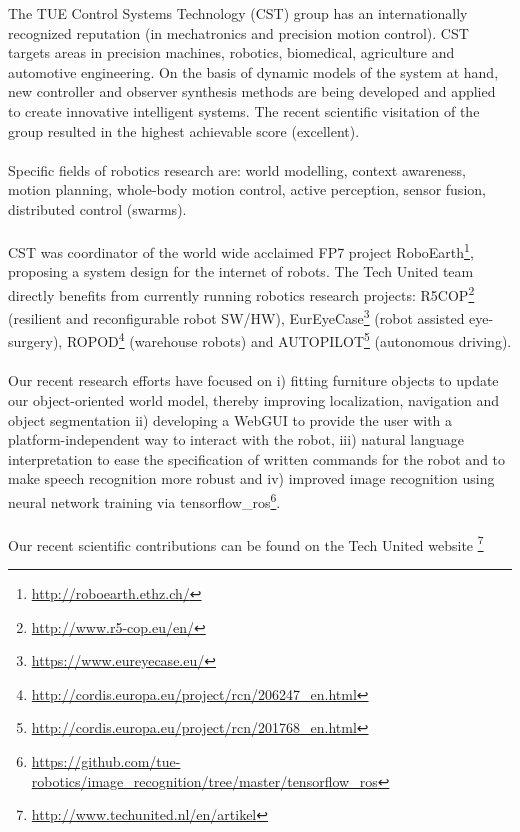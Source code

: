 The TUE Control Systems Technology (CST) group has an internationally recognized reputation (in mechatronics and precision motion control). CST targets areas in precision machines, robotics, biomedical, agriculture and automotive engineering. On the basis of dynamic models of the system at hand, new controller and observer synthesis methods are being developed and applied to create innovative intelligent systems. The recent scientific visitation of the group resulted in the highest achievable score (excellent). 
\\\\
Specific fields of robotics research are: world modelling, context awareness, motion planning, whole-body motion control, active perception, sensor fusion, distributed control (swarms).
\\\\
CST was coordinator of the world wide acclaimed FP7 project RoboEarth\footnote{\url{http://roboearth.ethz.ch/}}, proposing a system design for the internet of robots. The Tech United team directly benefits from currently running robotics research projects: R5COP\footnote{\url{http://www.r5-cop.eu/en/}} (resilient and reconfigurable robot SW/HW), EurEyeCase\footnote{\url{https://www.eureyecase.eu/}} (robot assisted eye-surgery), ROPOD\footnote{\url{http://cordis.europa.eu/project/rcn/206247_en.html}} (warehouse robots) and AUTOPILOT\footnote{\url{http://cordis.europa.eu/project/rcn/201768_en.html}} (autonomous driving). 
\\\\
Our recent research efforts have focused on i) fitting furniture objects to update our object-oriented world model, thereby improving localization, navigation and object segmentation ii) developing a WebGUI to provide the user with a platform-independent way to interact with the robot, iii) natural language interpretation to ease the specification of written commands for the robot and to make speech recognition more robust and iv) improved image recognition using neural network training via tensorflow\_ros\footnote{\url{https://github.com/tue-robotics/image_recognition/tree/master/tensorflow_ros}}.
\\\\
Our recent scientific contributions can be found on the Tech United website \footnote{\url{http://www.techunited.nl/en/artikel}}
